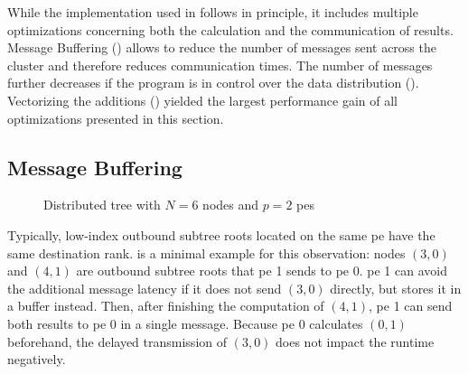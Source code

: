 While the implementation used in  follows  in principle, it includes multiple optimizations concerning both the calculation and the communication of results.
Message Buffering () allows to reduce the number of messages sent across the cluster and therefore reduces communication times.
The number of messages further decreases if the program is in control over the data distribution ().
Vectorizing the additions () yielded the largest performance gain of all optimizations presented in this section.

\subsection{Message Buffering}
\label{sec:MessageBuffering}

\begin{figure}[H]
\centering
{}
\caption{Distributed tree with $N=6$ nodes and $p=2$ \glspl{pe}}
\label{fig:messageBufferingTree}
\end{figure}

Typically, low-index outbound subtree roots located on the same \gls{pe} have the same destination rank.
 is a minimal example for this observation: nodes $(3,0)$ and $(4,1)$ are outbound subtree roots that \gls{pe} 1 sends to \gls{pe} 0.
\gls{pe} 1 can avoid the additional message latency if it does not send $(3,0)$ directly, but stores it in a buffer instead.
Then, after finishing the computation of $(4,1)$, \gls{pe} 1 can send both results to \gls{pe} 0 in a single message.
Because \gls{pe} 0 calculates $(0,1)$ beforehand, the delayed transmission of $(3,0)$ does not impact the runtime negatively.

